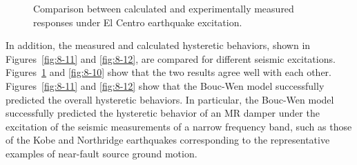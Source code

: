 \begin{figure}[H]
\centering
{}
\caption{Comparison between calculated and experimentally measured responses under El Centro earthquake excitation.}
\label{fig:8-9}
\end{figure}

In addition, the measured and calculated hysteretic behaviors, shown in Figures~\ref{fig:8-11} and \ref{fig:8-12}, are compared for different seismic excitations. Figures~\ref{fig:8-9} and \ref{fig:8-10} show that the two results agree well with each other. Figures~\ref{fig:8-11} and \ref{fig:8-12} show that the Bouc-Wen model successfully predicted the overall hysteretic behaviors. In particular, the Bouc-Wen model successfully predicted the hysteretic behavior of an MR damper under the excitation of the seismic measurements of a narrow frequency band, such as those of the Kobe and Northridge earthquakes corresponding to the representative examples of near-fault source ground motion.

